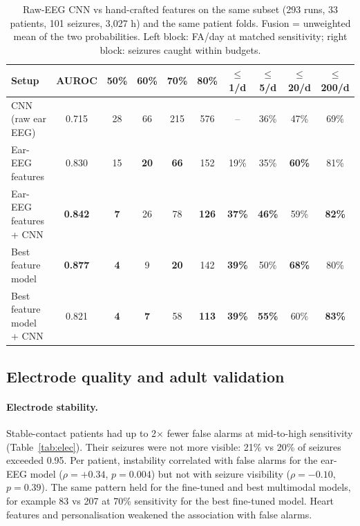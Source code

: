 \begin{table}[htbp]
\centering\small
\caption{Raw-EEG CNN vs hand-crafted features on the same subset (293 runs, 33 patients, 101 seizures, 3,027 h) and the same patient folds. Fusion = unweighted mean of the two probabilities. Left block: FA/day at matched sensitivity; right block: seizures caught within budgets.}
\label{tab:cnn}
\setlength{\tabcolsep}{3.2pt}
\begin{tabular}{@{}lccccc|cccc@{}}
\toprule
Setup & AUROC & 50\% & 60\% & 70\% & 80\% & $\le$1/d & $\le$5/d & $\le$20/d & $\le$200/d \\
\midrule
CNN (raw ear EEG) & 0.715 & 28 & 66 & 215 & 576 & -- & 36\% & 47\% & 69\% \\
Ear-EEG features & 0.830 & 15 & \textbf{20} & \textbf{66} & 152 & 19\% & 35\% & \textbf{60\%} & 81\% \\
Ear-EEG features + CNN & \textbf{0.842} & \textbf{7} & 26 & 78 & \textbf{126} & \textbf{37\%} & \textbf{46\%} & 59\% & \textbf{82\%} \\
\midrule
Best feature model & \textbf{0.877} & \textbf{4} & 9 & \textbf{20} & 142 & \textbf{39\%} & 50\% & \textbf{68\%} & 80\% \\
Best feature model + CNN & 0.821 & \textbf{4} & \textbf{7} & 58 & \textbf{113} & \textbf{39\%} & \textbf{55\%} & 60\% & \textbf{83\%} \\
\bottomrule
\end{tabular}
\end{table}

\subsection{Electrode quality and adult validation}

\paragraph{Electrode stability.} Stable-contact patients had up to 2$\times$ fewer false alarms at mid-to-high sensitivity (Table~\ref{tab:elec}). Their seizures were not more visible: 21\% vs 20\% of seizures exceeded 0.95. Per patient, instability correlated with false alarms for the ear-EEG model ($\rho=+0.34$, $p=0.004$) but not with seizure visibility ($\rho=-0.10$, $p=0.39$). The same pattern held for the fine-tuned and best multimodal models, for example 83 vs 207 \FAd{} at 70\% sensitivity for the best fine-tuned model. Heart features and personalisation weakened the association with false alarms.

